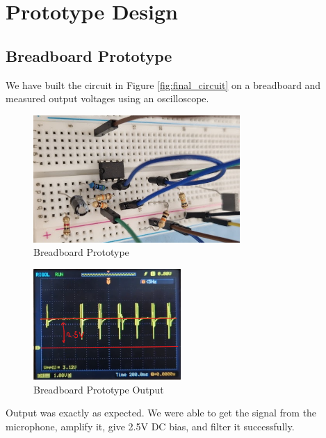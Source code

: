 \newpage
\thispagestyle{plain}

\section{Prototype Design}

\subsection{Breadboard Prototype}
We have built the circuit in Figure \ref{fig:final_circuit} on a breadboard and measured output voltages using an oscilloscope.

\begin{figure}[h]
	\centering
	\includegraphics[width=0.7\textwidth]{assets/breadboard.png}
	\caption{Breadboard Prototype}
	\label{fig:breadboard_prototype}
\end{figure}

\begin{figure}[h]
	\centering
	\includegraphics[width=0.5\textwidth]{assets/breadboard-output.png}
	\caption{Breadboard Prototype Output}
	\label{fig:breadboard_prototype_output}
\end{figure}

Output was exactly as expected. We were able to get the signal from the microphone, amplify it, give 2.5V DC bias, and filter it successfully.

\newpage
\thispagestyle{plain}

